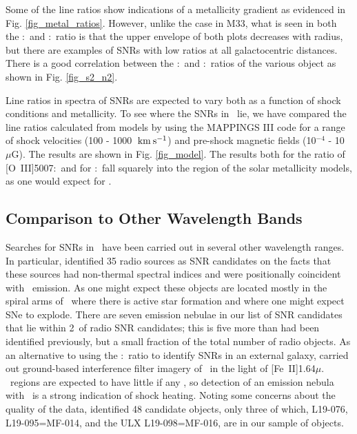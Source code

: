 Some of the line ratios show indications of a metallicity gradient as evidenced in Fig. \ref{fig_metal_ratios}.  However, unlike the case in M33, what is seen in both the \nii:\ha\ and \sii:\ha\ ratio is that the upper envelope of both plots decreases with radius, but there are examples of SNRs with low ratios at all galactocentric distances.   There is a good correlation between the \nii:\ha\ and \sii:\ha\ ratios of the various object as shown in Fig. \ref{fig_s2_n2}.




Line ratios in spectra of SNRs are expected to vary both as a function of shock conditions and metallicity.  To see where the SNRs in \gal\ lie, we have compared the line ratios calculated from models by \cite{allen08} using the MAPPINGS III code for a range of shock velocities (100 - 1000 $\:{\rm km\:s^{-1}}$) and pre-shock magnetic fields (10$^{-4}$ - 10 $\mu$G).  The results are shown in Fig. \ref{fig_model}.  The results both for the ratio of [O~III]5007:\hb\ and for \sii:\ha\ fall squarely into the region of the solar metallicity models, as one would expect for \gal.

\subsection{Comparison to Other Wavelength Bands}


Searches for SNRs in \gal\ have been carried out in several other wavelength ranges.  In particular,  \cite{lacey01} identified 35 radio sources as SNR candidates on the facts that these sources had non-thermal spectral indices and were positionally coincident with \ha\ emission.  As one might expect these objects are located mostly in the spiral arms of \gal\ where there is active star formation and where one might expect SNe to explode.  There are seven emission nebulae in our list of SNR candidates that lie within 2\arcsec\ of radio SNR candidates; this is five more than had been identified previously, but a small fraction of the total number of radio objects.  As an alternative to using the \sii:\ha\ ratio to identify SNRs in an external galaxy, \cite{bruursema14}  carried out ground-based interference filter imagery of \gal\ in the light of [Fe~II]1.64$\mu$.  \hii\ regions are expected to have little if any \feii, so detection of an emission nebula with \feii\ is a strong indication of shock heating.  Noting some concerns about the quality of the data,  \cite{bruursema14}  identified 48 candidate objects, only three of which, L19-076, L19-095=MF-014, and the ULX L19-098=MF-016, are in our sample of objects.  

